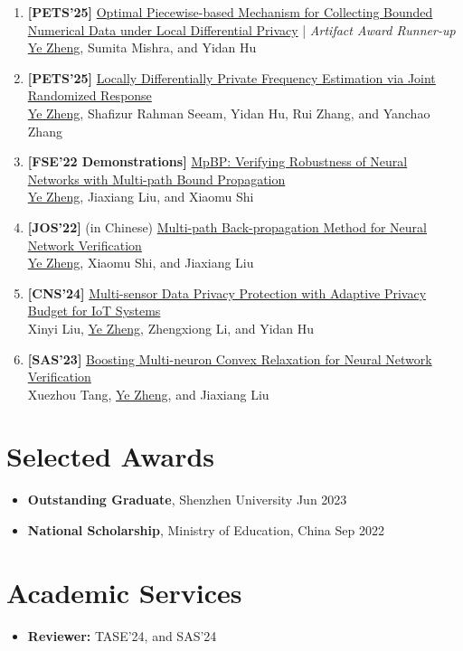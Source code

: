 \documentclass[a4paper,11pt]{article}
\begin{document}
\begin{enumerate}[leftmargin=*,labelsep=2mm]
  \item \textbf{[PETS'25]} \href{https://petsymposium.org/popets/2025/popets-2025-0124.pdf}
  {Optimal Piecewise-based Mechanism for Collecting Bounded Numerical Data under Local Differential Privacy} | 
  \normalem\emph{Artifact Award Runner-up}\ULforem \\
  \uline{Ye Zheng}, Sumita Mishra, and Yidan Hu
  \item \textbf{[PETS'25]} \href{https://arxiv.org/pdf/2505.10349}
  {Locally Differentially Private Frequency Estimation via Joint Randomized Response} \\
  \uline{Ye Zheng}, Shafizur Rahman Seeam, Yidan Hu, Rui Zhang, and Yanchao Zhang
  \item \textbf{[FSE'22 Demonstrations]} \href{https://dl.acm.org/doi/pdf/10.1145/3540250.3558924}
  {MpBP: Verifying Robustness of Neural Networks with Multi-path Bound Propagation} \\
  \uline{Ye Zheng}, Jiaxiang Liu, and Xiaomu Shi
  \item \textbf{[JOS'22]} (in Chinese) \href{https://www.jos.org.cn/jos/article/pdf/6585}
  {Multi-path Back-propagation Method for Neural Network Verification} \\
  \uline{Ye Zheng}, Xiaomu Shi, and Jiaxiang Liu
  \item \textbf{[CNS'24]} \href{https://ieeexplore.ieee.org/abstract/document/10735696}
  {Multi-sensor Data Privacy Protection with Adaptive Privacy Budget for IoT Systems} \\
  Xinyi Liu, \uline{Ye Zheng}, Zhengxiong Li, and Yidan Hu
  \item \textbf{[SAS'23]} \href{https://link.springer.com/chapter/10.1007/978-3-031-44245-2_23}
  {Boosting Multi-neuron Convex Relaxation for Neural Network Verification} \\
  Xuezhou Tang, \uline{Ye Zheng}, and Jiaxiang Liu
\end{enumerate}


\section{\textbf{Selected Awards}}

\begin{itemize}[leftmargin=0pt,label={}]
  \item \textbf{Outstanding Graduate}, Shenzhen University \hfill Jun 2023\vspace{-0.5em}
  \item \textbf{National Scholarship}, Ministry of Education, China \hfill Sep 2022
\end{itemize}


\section{\textbf{Academic Services}}

\begin{itemize}[leftmargin=0pt,label={}]
  \item \textbf{Reviewer:} TASE'24, and SAS'24
\end{itemize}
\end{document}
